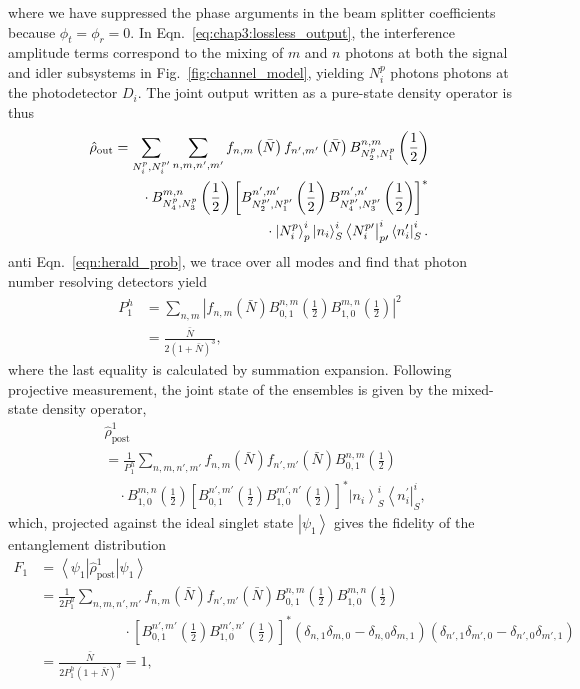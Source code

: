 \documentclass[aps,twocolumn,secnumarabic,amsmath,amssymb,pra,groupedaddress,
showpacs, showkeys,draft]{revtex4-1}
\newcommand{\bra}[1]{\left\langle #1 \right|}
\newcommand{\ket}[1]{\left|#1\right\rangle}
\newcommand{\pna}[1]{\left(#1\right)}
\newcommand{\pnb}[1]{\left[#1\right]}
\newcommand{\abs}[1]{\left|#1\right|}
\begin{document}
where we have suppressed the phase arguments in the beam splitter coefficients
because $\phi_t=\phi_r=0$. In Eqn.~\ref{eq:chap3:lossless_output}, the
interference amplitude terms correspond to the mixing of $m$ and $n$ photons at
both the signal and idler subsystems in Fig.~\ref{fig:channel_model}, yielding
$N^p_i$ photons photons at the photodetector $D_i$. The joint output written as
a pure-state density operator is thus
\begin{align}
\hat{\rho}_{\textrm{out}} & =\sum_{N_i^p, N_i^{p\prime}}\sum_{n,m,n',m'} f_{n,m}\pna{\bar{N}}f_{n',m'}\pna{\bar{N}} B_{N_2^p,N_1^p}^{n,m}\pna{\frac{1}{2}}   \nonumber \\
& \qquad\cdot  B_{N_4^p,N_3^p}^{m,n}\pna{\frac{1}{2}}\pnb{B_{N_2^{p\prime},N_1^{p\prime}}^{n',m'}\pna{\frac{1}{2}}  
B_{N_4^{p\prime},N_3^{p\prime}}^{m',n'}\pna{\frac{1}{2}}}^*\nonumber \\ 
& \hspace{1.5in}\cdot\ket{N_i^{p}}^i_p\ket{n_i}^i_S\bra{N_i^{p\prime}}^i_{p\prime}\bra{n_i^{\prime}}^i_S .\label{eqn:joint_state_lossless}
\end{align}
anti
Eqn.~\ref{eqn:herald_prob}, we trace over all modes and find that photon number
resolving detectors yield
\begin{align}
	P_{1}^{h} & = \sum_{n,m} \abs{f_{n,m}\pna{\bar{N}} 
		B_{0,1}^{n,m}\pna{\frac{1}{2}}
                B_{1,0}^{m,n}\pna{\frac{1}{2}}}^2 \nonumber \\ & =\frac{\bar{N}}{2\pna{1+\bar{N}}^3},\label{eq:chap3:lossless_prob}
\end{align}
where the last equality is calculated by summation expansion. Following
projective measurement, the joint state of the ensembles is given by the
mixed-state density operator,
\begin{align}
& \hat{\rho}_{\textrm{post}}^{1} \nonumber \\ & = \frac{1}{P_{1}^{h}}\sum_{n,m,n',m'} f_{n,m}\pna{\bar{N}}f_{n',m'}\pna{\bar{N}} B_{0,1}^{n,m}\pna{\frac{1}{2}}   \nonumber \\
& \quad \cdot B_{1,0}^{m,n}\pna{\frac{1}{2}}\pnb{B_{0,1}^{n',m'}\pna{\frac{1}{2}}  
B_{1,0}^{m',n'}\pna{\frac{1}{2}}}^*\ket{n_i}^i_S\bra{n_i^{\prime}}^i_S,\label{eqn:post:lossless}
\end{align}
which, projected against the ideal singlet state $\ket{\psi_{1}}$ gives the
fidelity of the entanglement distribution
\begin{align}
	F_{1}&=\bra{\psi_{1}}\hat{\rho}_{\textrm{post}}^{1} \ket{\psi_{1}} \nonumber \\
		& = \frac{1}{2P_{1}^{h}}\sum_{n,m,n',m'} f_{n,m}\pna{\bar{N}}f_{n',m'}\pna{\bar{N}} B_{0,1}^{n,m}\pna{\frac{1}{2}}  
		B_{1,0}^{m,n}\pna{\frac{1}{2}}\nonumber \\ 
		& \qquad \qquad \qquad \cdot \pnb{B_{0,1}^{n',m'}\pna{\frac{1}{2}} B_{1,0}^{m',n'}\pna{\frac{1}{2}}}^*\pna{\delta_{n,1}\delta_{m,0}-\delta_{n,0}\delta_{m,1}}\pna{\delta_{n',1}\delta_{m',0}-\delta_{n',0}\delta_{m',1}} \nonumber \\
		& = \frac{\bar{N}}{2P_{1}^{h}\pna{1+\bar{N}}^3}=1,
\end{align}
\end{document}
